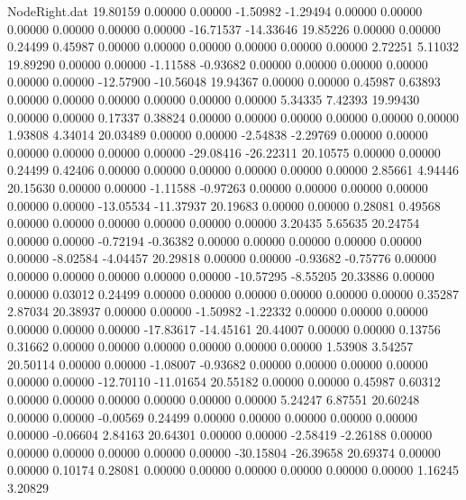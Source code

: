\begin{filecontents}{NodeRight.dat}
  19.80159    0.00000    0.00000    -1.50982   -1.29494    0.00000    0.00000    0.00000    0.00000    0.00000    0.00000  -16.71537  -14.33646
  19.85226    0.00000    0.00000     0.24499    0.45987    0.00000    0.00000    0.00000    0.00000    0.00000    0.00000    2.72251    5.11032
  19.89290    0.00000    0.00000    -1.11588   -0.93682    0.00000    0.00000    0.00000    0.00000    0.00000    0.00000  -12.57900  -10.56048
  19.94367    0.00000    0.00000     0.45987    0.63893    0.00000    0.00000    0.00000    0.00000    0.00000    0.00000    5.34335    7.42393
  19.99430    0.00000    0.00000     0.17337    0.38824    0.00000    0.00000    0.00000    0.00000    0.00000    0.00000    1.93808    4.34014
  20.03489    0.00000    0.00000    -2.54838   -2.29769    0.00000    0.00000    0.00000    0.00000    0.00000    0.00000  -29.08416  -26.22311
  20.10575    0.00000    0.00000     0.24499    0.42406    0.00000    0.00000    0.00000    0.00000    0.00000    0.00000    2.85661    4.94446
  20.15630    0.00000    0.00000    -1.11588   -0.97263    0.00000    0.00000    0.00000    0.00000    0.00000    0.00000  -13.05534  -11.37937
  20.19683    0.00000    0.00000     0.28081    0.49568    0.00000    0.00000    0.00000    0.00000    0.00000    0.00000    3.20435    5.65635
  20.24754    0.00000    0.00000    -0.72194   -0.36382    0.00000    0.00000    0.00000    0.00000    0.00000    0.00000   -8.02584   -4.04457
  20.29818    0.00000    0.00000    -0.93682   -0.75776    0.00000    0.00000    0.00000    0.00000    0.00000    0.00000  -10.57295   -8.55205
  20.33886    0.00000    0.00000     0.03012    0.24499    0.00000    0.00000    0.00000    0.00000    0.00000    0.00000    0.35287    2.87034
  20.38937    0.00000    0.00000    -1.50982   -1.22332    0.00000    0.00000    0.00000    0.00000    0.00000    0.00000  -17.83617  -14.45161
  20.44007    0.00000    0.00000     0.13756    0.31662    0.00000    0.00000    0.00000    0.00000    0.00000    0.00000    1.53908    3.54257
  20.50114    0.00000    0.00000    -1.08007   -0.93682    0.00000    0.00000    0.00000    0.00000    0.00000    0.00000  -12.70110  -11.01654
  20.55182    0.00000    0.00000     0.45987    0.60312    0.00000    0.00000    0.00000    0.00000    0.00000    0.00000    5.24247    6.87551
  20.60248    0.00000    0.00000    -0.00569    0.24499    0.00000    0.00000    0.00000    0.00000    0.00000    0.00000   -0.06604    2.84163
  20.64301    0.00000    0.00000    -2.58419   -2.26188    0.00000    0.00000    0.00000    0.00000    0.00000    0.00000  -30.15804  -26.39658
  20.69374    0.00000    0.00000     0.10174    0.28081    0.00000    0.00000    0.00000    0.00000    0.00000    0.00000    1.16245    3.20829

\end{filecontents}
